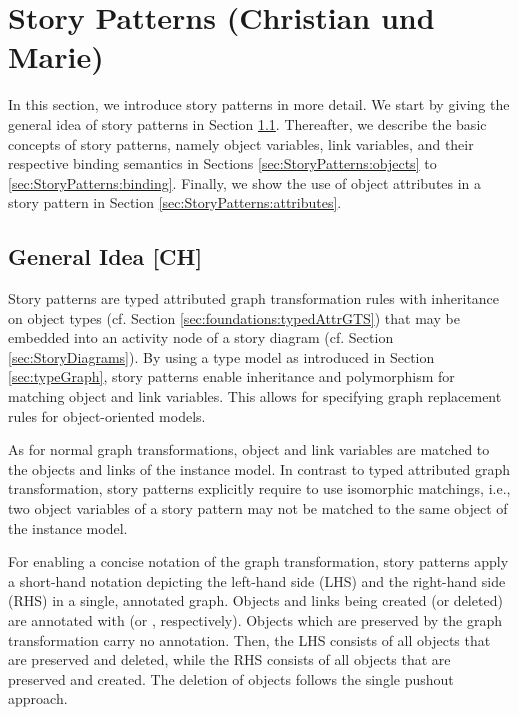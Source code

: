 \section{Story Patterns (Christian und Marie)} \label{sec:StoryPatterns}

In this section, we introduce story patterns in more detail.
We start by giving the general idea of story patterns in Section \ref{sec:StoryPatterns:storyPattern}.
Thereafter, we describe the basic concepts of story patterns, namely object variables, link variables,
and their respective binding semantics in Sections \ref{sec:StoryPatterns:objects} to \ref{sec:StoryPatterns:binding}.
Finally, we show the use of object attributes in a story pattern in Section \ref{sec:StoryPatterns:attributes}.


\subsection{General Idea [CH]}
\label{sec:StoryPatterns:storyPattern}

Story patterns are typed attributed graph transformation rules with inheritance on object types (cf. Section \ref{sec:foundations:typedAttrGTS}) that may be embedded into an activity node of a story diagram (cf. Section \ref{sec:StoryDiagrams}).
 By using a type model as introduced in Section \ref{sec:typeGraph}, story patterns enable inheritance and polymorphism for matching object and link variables.
This allows for specifying graph replacement rules for object-oriented models.

As for normal graph transformations, object and link variables are matched to the objects and links of the instance model. 
In contrast to typed attributed graph transformation, story patterns explicitly require to use isomorphic matchings, i.e., two object variables of a story pattern may not be matched to the same object of the instance model.

For enabling a concise notation of the graph transformation, story patterns apply a short-hand notation depicting the left-hand side (LHS) and the right-hand side (RHS) in a single, annotated graph. 
Objects and links being created (or deleted) are annotated with \create (or  \destroy, respectively). 
Objects which are preserved by the graph transformation carry no annotation.
Then, the LHS consists of all objects that are preserved and deleted, while the RHS consists of all objects that are preserved and created. 
The deletion of objects follows the single pushout approach.


